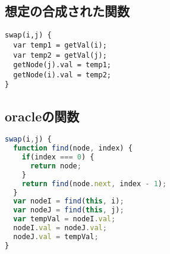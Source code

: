 \documentclass{article}
\begin{document}
\subsection{想定の合成された関数}
\begin{lstlisting}
swap(i,j) {
  var temp1 = getVal(i);
  var temp2 = getVal(j);
  getNode(j).val = temp1;
  getNode(i).val = temp2;
}
\end{lstlisting}

\subsection{oracleの関数}
\begin{lstlisting}[language=JavaScript]
swap(i,j) {
  function find(node, index) {
    if(index === 0) {
      return node;
    }
    return find(node.next, index - 1);
  }
  var nodeI = find(this, i);
  var nodeJ = find(this, j);
  var tempVal = nodeI.val;
  nodeI.val = nodeJ.val;
  nodeJ.val = tempVal;
}
\end{lstlisting}


\end{document}
